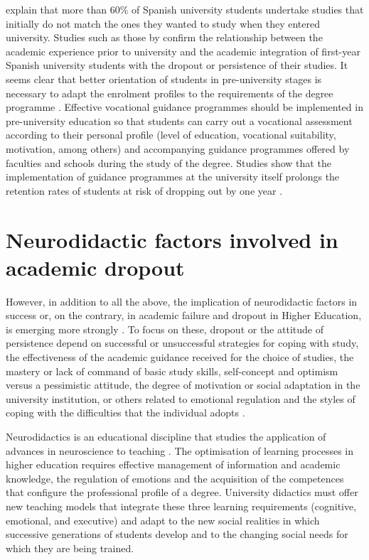 \documentclass[english]{textolivre}
\begin{document}
\textcite{cabrera_evolucion_2014} explain that more than 60\% of Spanish university students undertake studies that initially do not match the ones they wanted to study when they entered university. Studies such as those by \textcite{gairin_student_2014,torrado_contexto_2013} confirm the relationship between the academic experience prior to university and the academic integration of first-year Spanish university students with the dropout or persistence of their studies. It seems clear that better orientation of students in pre-university stages is necessary to adapt the enrolment profiles to the requirements of the degree programme \cite{fernandez_cruz_nuevas_2011,fernandez_cruz_formacion_2015}. Effective vocational guidance programmes should be implemented in pre-university education so that students can carry out a vocational assessment according to their personal profile (level of education, vocational suitability, motivation, among others) and accompanying guidance programmes offered by faculties and schools during the study of the degree. Studies show that the implementation of guidance programmes at the university itself prolongs the retention rates of students at risk of dropping out by one year \cite{louise_mathematics_2015,blundell_descriptive_2015}.

\section{Neurodidactic factors involved in academic dropout}\label{sec-conduta}
However, in addition to all the above, the implication of neurodidactic factors in success or, on the contrary, in academic failure and dropout in Higher Education, is emerging more strongly \cite{jorda_neurodidactica_2018}. To focus on these, dropout or the attitude of persistence depend on successful or unsuccessful strategies for coping with study, the effectiveness of the academic guidance received for the choice of studies, the mastery or lack of command of basic study skills, self-concept and optimism versus a pessimistic attitude, the degree of motivation or social adaptation in the university institution, or others related to emotional regulation and the styles of coping with the difficulties that the individual adopts \cite{muchiut_neurodidactica_2018}.

Neurodidactics is an educational discipline that studies the application of advances in neuroscience to teaching \cite{hernandez_fernandez_relation_2020}. The optimisation of learning processes in higher education requires effective management of information and academic knowledge, the regulation of emotions and the acquisition of the competences that configure the professional profile of a degree. University didactics must offer new teaching models that integrate these three learning requirements (cognitive, emotional, and executive) and adapt to the new social realities in which successive generations of students develop and to the changing social needs for which they are being trained.
\end{document}
